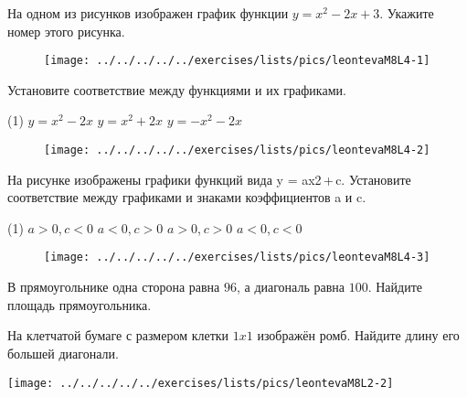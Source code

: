 \begin{class}[number=4]
	\begin{listofex}
		\item  На одном из рисунков изображен график функции \( y=x^{2}-2x +3 \). Укажите номер этого рисунка.
		\begin{figure}[h!]
			\texttt{[image: ../../../../../exercises/lists/pics/leontevaM8L4-1]}
		\end{figure}
		\newpage
		\item Установите соответствие между функциями и их графиками.	
		\begin{tasks}(1)
			\task \( y=x^{2}- 2x \)
			\task \( y=x^{2}+ 2x \)
			\task \( y=-x^{2}- 2x \)
		\end{tasks}
		\begin{figure}[h!]
			\caption{}
			\label{fig:leontevam8l4-2}
			\texttt{[image: ../../../../../exercises/lists/pics/leontevaM8L4-2]}
		\end{figure}
		\newpage
		\item На рисунке изображены графики функций вида y  =  ax2 + c. Установите соответствие между графиками и знаками коэффициентов a и c.
		\begin{tasks}(1)
			\task  \( a > 0 \), \( c < 0 \)	
			\task  \( a < 0 \), \( c > 0 \)	
			\task \( a > 0 \), \( c > 0 \)	
			\task \( a < 0 \), \( c < 0 \)
		\end{tasks}
		\begin{figure}[h!]
			\caption{}
			\label{fig:leontevam8l4-3}
			\texttt{[image: ../../../../../exercises/lists/pics/leontevaM8L4-3]}
		\end{figure}
		\item В прямоугольнике одна сторона равна \( 96 \), а диагональ равна \( 100 \). Найдите площадь прямоугольника.
		\item 
		\begin{minipage}[t]{\bodywidth}
			На клетчатой бумаге с размером клетки \( 1x1 \) изображён ромб. Найдите длину его большей диагонали.
		\end{minipage}
		\hspace{0.02\linewidth}
		\begin{minipage}[t]{\picwidth}
			\texttt{[image: ../../../../../exercises/lists/pics/leontevaM8L2-2]}
		\end{minipage}
		\item 
		\begin{minipage}[t]{\bodywidth}

\end{minipage}
\end{listofex}
\end{class}
